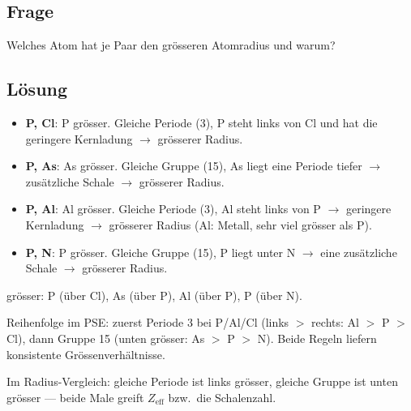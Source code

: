 
\subsection*{Frage}
Welches Atom hat je Paar den grösseren Atomradius und warum?

\subsection*{Lösung}
\begin{itemize}
  \item \textbf{P, Cl}: P grösser. Gleiche Periode (3), P steht links von Cl und
    hat die geringere Kernladung $\to$ grösserer Radius.
  \item \textbf{P, As}: As grösser. Gleiche Gruppe (15), As liegt eine Periode
    tiefer $\to$ zusätzliche Schale $\to$ grösserer Radius.
  \item \textbf{P, Al}: Al grösser. Gleiche Periode (3), Al steht links von P
    $\to$ geringere Kernladung $\to$ grösserer Radius (Al: Metall, sehr viel
    grösser als P).
  \item \textbf{P, N}: P grösser. Gleiche Gruppe (15), P liegt unter N $\to$
    eine zusätzliche Schale $\to$ grösserer Radius.
\end{itemize}

\begin{ergebnis}
grösser: P (über Cl), As (über P), Al (über P), P (über N).
\end{ergebnis}

\begin{kontrolle}
Reihenfolge im PSE: zuerst Periode 3 bei P/Al/Cl (links $>$ rechts: Al $>$ P $>$
Cl), dann Gruppe 15 (unten grösser: As $>$ P $>$ N). Beide Regeln liefern
konsistente Grössenverhältnisse.
\end{kontrolle}

\begin{merksatz}
Im Radius-Vergleich: gleiche Periode ist links grösser, gleiche Gruppe ist unten
grösser --- beide Male greift $Z_{\mathrm{eff}}$ bzw.\ die Schalenzahl.
\end{merksatz}
